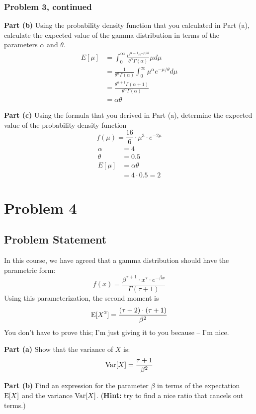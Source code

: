 \documentclass[12pt]{article}
\theoremstyle{definition}
\begin{document}
\newpage
\subsubsection*{Problem 3, continued}

\noindent
{\bf Part (b)} Using the probability density function that you calculated in Part (a), calculate the expected value of the gamma distribution in terms of the parameters $\alpha$ and $\theta$.
\begin{align*}
E[\mu] &= \int_0^\infty \frac{\mu^{\alpha - 1} e^{-\mu/\theta}}{\theta^\alpha\Gamma(\alpha)}  \mu d\mu\\
&= \frac{1}{\theta^\alpha\Gamma(\alpha)} \int_0^\infty \mu^\alpha e^{-\mu/\theta} d\mu\\
&= \frac{\theta^{\alpha + 1}\Gamma(\alpha + 1)}{\theta^\alpha\Gamma(\alpha)}\\
&= \alpha\theta
\end{align*}

\noindent
{\bf Part (c)} Using the formula that you derived in Part (a), determine the expected value of the probability density function
$$
f(\mu) = \frac{16}{6} \cdot \mu^3 \cdot e^{-2\mu}
$$
\begin{align*}
\alpha &= 4\\
\theta &= 0.5\\
E[\mu] &= \alpha\theta\\
&= 4 \cdot 0.5 = 2
\end{align*}

\newpage
\section*{Problem 4}

\subsection*{Problem Statement}

In this course, we have agreed that a gamma distribution should have the parametric form:
$$
f(x) = \frac{ \beta^{\tau + 1} \cdot x^\tau \cdot e^{-\beta x} }{\Gamma( \tau + 1)}
$$
Using this parameterization, the second moment is
$$
\hbox{E}[X^2] = \frac{(\tau + 2) \cdot (\tau + 1)}{\beta^2}
$$
You don't have to prove this; I'm just giving it to you because -- I'm nice.

\bigskip
\noindent
{\bf Part (a)} Show that the variance of $X$ is:
$$
\hbox{Var}[X] = \frac{\tau + 1}{\beta^2}
$$

\bigskip
\noindent
{\bf Part (b)} Find an expression for the parameter $\beta$ in terms of the expectation $\hbox{E}[X]$ and the variance $\hbox{Var}[X]$. ({\bf Hint:} try to find a nice ratio that cancels out terms.)
\end{document}
